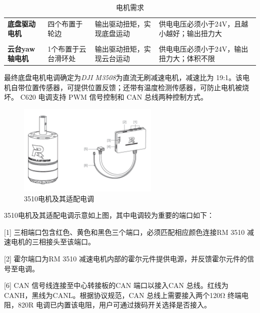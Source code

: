 \begin{table}[H]
	\centering%
	\caption[centering]{电机需求}%
	\label{motorxq}%
	\begin{tabular}{C{2cm}C{3cm}p{3cm}p{4cm}}	
		\toprule
		 & & &\\ 
		\midrule
		
		\textbf{底盘驱动电机} & 四个布置于轮边 & 输出驱动扭矩，实现底盘运动 & 供电电压必须小于24V，且越小越好；输出扭力大 \\
		\\
		\textbf{云台yaw轴电机} & 1个布置于云台滑环处 & 输出驱动扭矩，实现云台运动 & 供电电压必须小于24V，输出扭力大；体积不限 \\		
		
		\bottomrule
	\end{tabular}
\end{table}

最终底盘电机电调确定为\emph{DJI M3508}为直流无刷减速电机，减速比为 19:1。该电机自带位置传感器，可提供位置反馈；还带有温度检测传感器，可防止电机被烧坏。 C620 电调支持 PWM 信号控制和 CAN 总线两种控制方式。

\begin{figure}[H]
	\centering
	\includegraphics[width = 0.6\textwidth]{fig/3510.png}
	\caption{3510电机及其适配电调}
	\label{3510}
\end{figure}

3510电机及其适配电调示意如上图，其中电调较为重要的端口如下：

[1] 三相端口包含红色、黄色和黑色三个端口，必须匹配相应颜色连接RM 3510 减速电机的三相接头至该端口。

[2] 霍尔端口为RM 3510 减速电机内部的霍尔元件提供电源，并反馈霍尔元件的信号至电调。

[6] CAN 信号线连接至中心转接板的CAN 端口以接入CAN 总线。红线为CANH，黑线为CANL。根据协议规范，CAN 总线上需要接入两个120Ω 终端电阻，820R 电调已内置该电阻，用户可通过拨码开关选择是否接入。

